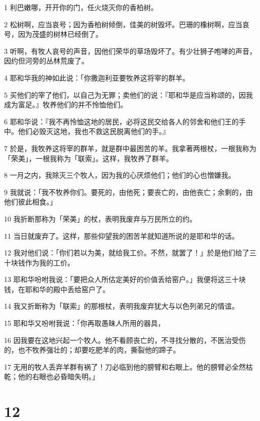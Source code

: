 \par 1 利巴嫩哪，开开你的门，任火烧灭你的香柏树。
\par 2 松树啊，应当哀号；因为香柏树倾倒，佳美的树毁坏。巴珊的橡树啊，应当哀号，因为茂盛的树林已经倒了。
\par 3 听啊，有牧人哀号的声音，因他们荣华的草场毁坏了。有少壮狮子咆哮的声音，因约但河旁的丛林荒废了。
\par 4 耶和华我的神如此说：「你撒迦利亚要牧养这将宰的群羊。
\par 5 买他们的宰了他们，以自己为无罪；卖他们的说：『耶和华是应当称颂的，因我成为富足。』牧养他们的并不怜恤他们。
\par 6 耶和华说：『我不再怜恤这地的居民，必将这民交给各人的邻舍和他们王的手中。他们必毁灭这地，我也不救这民脱离他们的手。』
\par 7 於是，我牧养这将宰的群羊，就是群中最困苦的羊。我拿著两根杖，一根我称为「荣美」，一根我称为「联索」。这样，我牧养了群羊。
\par 8 一月之内，我除灭三个牧人，因为我的心厌烦他们；他们的心也憎嫌我。
\par 9 我就说：「我不牧养你们。要死的，由他死；要丧亡的，由他丧亡；余剩的，由他们彼此相食。」
\par 10 我折断那称为「荣美」的杖，表明我废弃与万民所立的约。
\par 11 当日就废弃了。这样，那些仰望我的困苦羊就知道所说的是耶和华的话。
\par 12 我对他们说：「你们若以为美，就给我工价。不然，就罢了！」於是他们给了三十块钱作为我的工价。
\par 13 耶和华吩咐我说：「要把众人所估定美好的价值丢给窑户。」我便将这三十块钱，在耶和华的殿中丢给窑户了。
\par 14 我又折断称为「联索」的那根杖，表明我废弃犹大与以色列弟兄的情谊。
\par 15 耶和华又吩咐我说：「你再取愚昧人所用的器具，
\par 16 因我要在这地兴起一个牧人。他不看顾丧亡的，不寻找分散的，不医治受伤的，也不牧养强壮的；却要吃肥羊的肉，撕裂他的蹄子。
\par 17 无用的牧人丢弃羊群有祸了！刀必临到他的膀臂和右眼上。他的膀臂必全然枯乾；他的右眼也必昏暗失明。」

\chapter{12}

